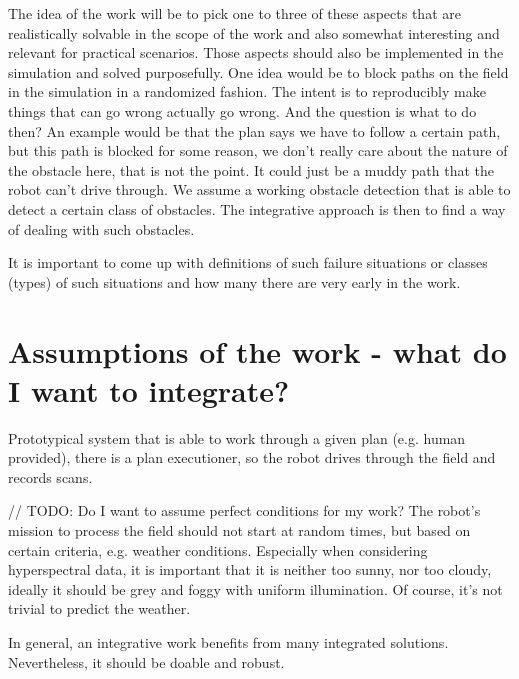 \documentclass[german, master, expose, latin1]{base/thesis_KBS}
\begin{document}
The idea of the work will be to pick one to three of these aspects that are realistically solvable in the scope of the work and also somewhat interesting and 
relevant for practical scenarios. Those aspects should also be implemented in the simulation and solved purposefully.
One idea would be to block paths on the field in the simulation in a randomized fashion. The intent is to reproducibly make things that can go wrong actually go wrong.
And the question is what to do then? An example would be that the plan says we have to follow a certain path, but this path is blocked for some reason, we don't really
care about the nature of the obstacle here, that is not the point. It could just be a muddy path that the robot can't drive through. We assume a working obstacle detection
that is able to detect a certain class of obstacles. The integrative approach is then to find a way of dealing with such obstacles.

It is important to come up with definitions of such failure situations or classes (types) of such situations and how many there are very early in the work.

\section{Assumptions of the work - what do I want to integrate?}

Prototypical system that is able to work through a given plan (e.g. human provided), there is a plan executioner, so the robot drives through the field and records scans.\newline

// TODO: Do I want to assume perfect conditions for my work?
The robot's mission to process the field should not start at random times, but based on certain criteria, e.g. weather conditions.
Especially when considering hyperspectral data, it is important that it is neither too sunny, nor too cloudy, ideally it should be grey and
foggy with uniform illumination. Of course, it's not trivial to predict the weather.\newline

In general, an integrative work benefits from many integrated solutions. Nevertheless, it should be doable and robust.\newline
\end{document}
